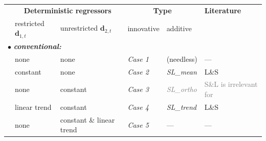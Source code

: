

\begin{threeparttable}
	\begin{tabular}{lll|l||ll}
		\hline\hline
		& \multicolumn{2}{c|}{ \textbf{Deterministic regressors} } & \multicolumn{2}{|c}{ \textbf{Type} } & \textbf{Literature} \\[4pt]
		& restricted $ \boldsymbol{d}_{1,t} $ & unrestricted $ \boldsymbol{d}_{2,t} $ & innovative\tnote{a)} \quad & additive\tnote{b)} &  \\ \hline
		\multicolumn{3}{l|}{$ \bullet $ \textit{\textbf{conventional:}}} & & & \\
		& none               & none                          & \textit{Case 1} & (needless) & --- \\
		& constant           & none                          & \textit{Case 2} & \textit{SL\_mean} & L\&S \citeyearpar[p.~185]{SaikkonenLutkepohl2000a} \\
		& none               & constant                      & \textit{Case 3} & \textcolor{gray}{\textit{SL\_ortho}} & \textcolor{gray}{S\&L \citeyearpar{SaikkonenLutkepohl2000} is irrelevant for \pkg{pvars}} \\
		& linear trend       & constant                      & \textit{Case 4} & \textit{SL\_trend} & L\&S \citeyearpar{SaikkonenLutkepohl2000a} \\
		& none               & constant \& linear trend      & \textit{Case 5} & --- & --- \\ \hline
		

\end{tabular}
\end{threeparttable}
